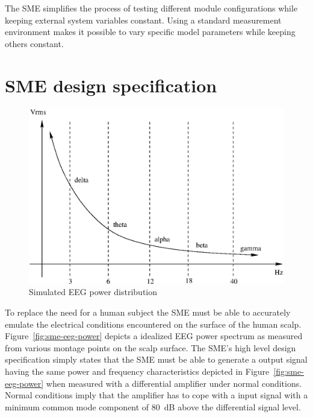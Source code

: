 The SME simplifies the process of testing different module
configurations while keeping external system variables constant. Using
a standard measurement environment makes it possible to vary specific
model parameters while keeping others constant. 

\section{SME design specification} \label{section:sme-design-spec}

\begin{figure}[htbp]
\begin{center}
        \includegraphics[width=\textwidth]{sme-eeg-power.eps}
        \caption{Simulated EEG power distribution}
        \label{fig:sme-eeg-power}
\end{center}
\end{figure}


To replace the need for a human subject the SME must be able to
accurately emulate the electrical conditions encountered on the
surface of the human scalp. Figure~\vref{fig:sme-eeg-power} depicts a
idealized EEG power spectrum as measured from various montage points
on the scalp surface. The SME's high level design specification simply
states that the SME must be able to generate a output signal having
the same power and frequency characteristics depicted in
Figure~\vref{fig:sme-eeg-power} when measured with a differential
amplifier under normal conditions. Normal conditions imply that the
amplifier has to cope with a input signal with a minimum common mode
component of 80~dB above the differential signal level.


